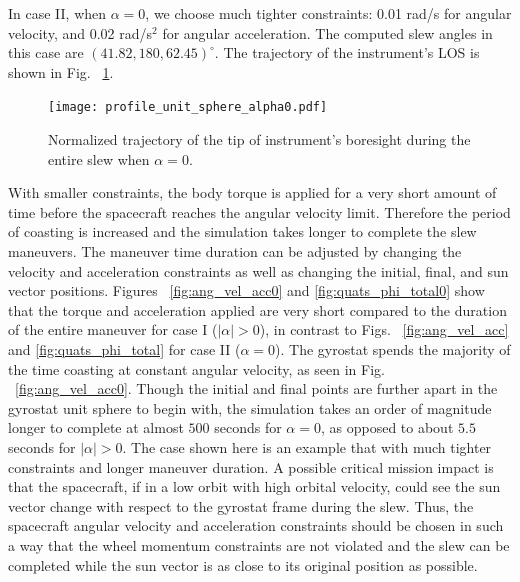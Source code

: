 \documentclass[journal ]{new-aiaa}
\begin{document}
In case II,  when $\alpha=0$, we choose much tighter constraints: 0.01 rad/s for angular velocity, and 0.02 rad/s$^2$ for angular acceleration. The computed slew angles in this case are $(41.82, 180, 62.45)^\circ$. The trajectory of the instrument's LOS is shown in Fig. ~\ref{fig:phi1_phi2_phi3_alpha0}.
\begin{figure}[!h]
\centering
		\texttt{[image: profile\_unit\_sphere\_alpha0.pdf]}		
\caption{Normalized trajectory of the tip of instrument's boresight during the entire slew when $\alpha=0$.}
\label{fig:phi1_phi2_phi3_alpha0}
\end{figure}	
With smaller constraints, the body torque is applied for a very short amount of time before the spacecraft reaches the angular velocity limit. Therefore the period of coasting is increased and the simulation takes longer to complete the slew maneuvers. The maneuver time duration can be adjusted by changing the velocity and acceleration constraints as well as changing the initial, final, and sun vector positions. Figures ~\ref{fig:ang_vel_acc0} and \ref{fig:quats_phi_total0} show that the torque and acceleration applied are very short compared to the duration of the entire maneuver for case I ($|\alpha| > 0$), in contrast to Figs. ~\ref{fig:ang_vel_acc} and \ref{fig:quats_phi_total} for case II ($\alpha = 0$). The gyrostat spends the majority of the time coasting at constant angular velocity, as seen in Fig. ~\ref{fig:ang_vel_acc0}. Though the initial and final points are further apart in the gyrostat unit sphere to begin with, the simulation takes an order of magnitude longer to complete at almost $500$ seconds for $\alpha = 0$, as opposed to about $5.5$ seconds for $|\alpha| > 0$. The case shown here is an example that with much tighter constraints and longer maneuver duration. A possible critical mission impact is that the spacecraft, if in a low orbit with high orbital velocity, could see the sun vector change with respect to the gyrostat frame during the slew. Thus, the spacecraft angular velocity and acceleration constraints should be chosen in such a way that the wheel momentum constraints are not violated and the slew can be completed while the sun vector is as close to its original position as possible. 
\end{document}
